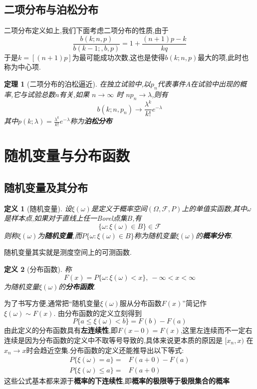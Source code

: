 \documentclass[12pt,a4paper]{article}
\newtheorem{thm}{定理}[subsection]  %
\newtheorem{definition}{定义}[subsection] %
\begin{document}
\subsection{二项分布与泊松分布}
二项分布定义如上,我们下面考虑二项分布的性质,由于\[\frac{b(k;n,p)}{b(k-1;,b,p)}=1 + \frac{(n+1)p-k}{kq}\]
于是$k=\left[(n+1)p\right]$为最可能成功次数,这也是使得$b(k;n,p)$最大的项,此时也称为中心项.
\begin{thm}[二项分布的泊松逼近]
    在独立试验中,以$p_n$代表事件$A$在试验中出现的概率,它与试验总数$n$有关,如果 $n\rightarrow \infty$ 时 $np_n\rightarrow \lambda$,则有
    \[b(k;n,p_n)\rightarrow \frac{\lambda^k}{k!}e^{-\lambda}\]
    其中$p(k;\lambda)=\frac{\lambda^k}{k!}e^{-\lambda}$称为\textbf{泊松分布}
\end{thm}
\newpage

\section{随机变量与分布函数}
\subsection{随机变量及其分布}
\begin{definition}[随机变量]
    设$\xi(\omega)$是定义于概率空间$(\varOmega,\mathscr{F},P)$上的单值实函数,其中$\omega$是样本点,如果对于直线上任一Borel点集$B$,有
    \[\{\omega:\xi(\omega)\in B\}\in \mathscr{F}\]
    则称$\xi(\omega)$为\textbf{随机变量},而$P\{\omega:\xi(\omega)\in B\}$称为随机变量$\xi(\omega)$的\textbf{概率分布}.
\end{definition}
随机变量其实就是测度空间上的可测函数.
\begin{definition}[分布函数]
    称\[F(x)=P\{\omega:\xi(\omega)<x\},\ -\infty<x<\infty\]
    为随机变量$\xi(\omega)$的\textbf{分布函数}.
\end{definition}
为了书写方便,通常把“随机变量$\xi(\omega)$服从分布函数$F(x)$”简记作$\xi(\omega)\sim F(x)$.
由分布函数的定义立刻得到\[P\{a\leq \xi (\omega)<b \} = F(b)-F(a)\]
由此定义的分布函数具有\textbf{左连续性},即$F(x-0)=F(x)$,这里左连续而不一定右连续是因为分布函数的定义中不取等号导致的,具体来说更本质的原因是
 $[x_n,x )$ 在$x_n\rightarrow x$时会趋近空集.分布函数的定义还能推导出以下等式:
\[\begin{aligned}
    P\{\xi(\omega)=a\}=&F(a+0)-F(a) \\ P\{\xi(\omega)\leq a\} =& F(a+0)
\end{aligned}\]
这些公式基本都来源于\textbf{概率的下连续性},即\textbf{概率的极限等于极限集合的概率}
\end{document}
